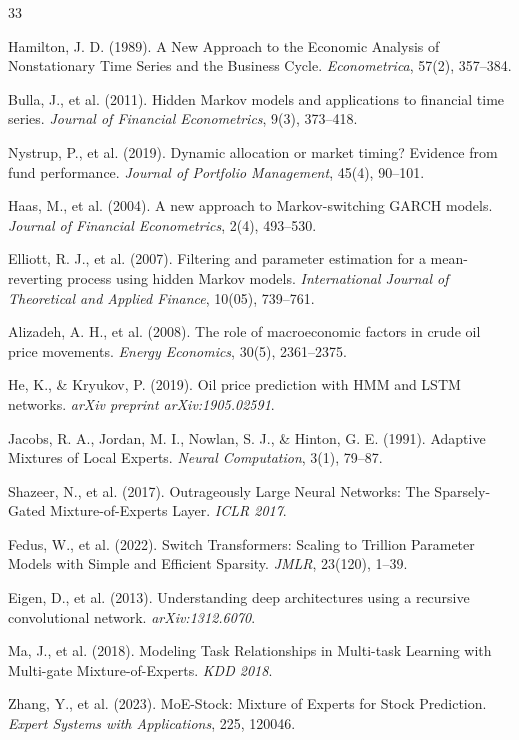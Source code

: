 \documentclass[3p,times]{elsarticle}
\begin{document}
\begin{thebibliography}{33}

Hamilton, J. D. (1989). A New Approach to the Economic Analysis of Nonstationary Time Series and the Business Cycle. \textit{Econometrica}, 57(2), 357--384.

Bulla, J., et al. (2011). Hidden Markov models and applications to financial time series. \textit{Journal of Financial Econometrics}, 9(3), 373--418.

Nystrup, P., et al. (2019). Dynamic allocation or market timing? Evidence from fund performance. \textit{Journal of Portfolio Management}, 45(4), 90--101.

Haas, M., et al. (2004). A new approach to Markov-switching GARCH models. \textit{Journal of Financial Econometrics}, 2(4), 493--530.

Elliott, R. J., et al. (2007). Filtering and parameter estimation for a mean-reverting process using hidden Markov models. \textit{International Journal of Theoretical and Applied Finance}, 10(05), 739--761.

Alizadeh, A. H., et al. (2008). The role of macroeconomic factors in crude oil price movements. \textit{Energy Economics}, 30(5), 2361--2375.

He, K., \& Kryukov, P. (2019). Oil price prediction with HMM and LSTM networks. \textit{arXiv preprint arXiv:1905.02591}.

Jacobs, R. A., Jordan, M. I., Nowlan, S. J., \& Hinton, G. E. (1991). Adaptive Mixtures of Local Experts. \textit{Neural Computation}, 3(1), 79--87.

Shazeer, N., et al. (2017). Outrageously Large Neural Networks: The Sparsely-Gated Mixture-of-Experts Layer. \textit{ICLR 2017}.

Fedus, W., et al. (2022). Switch Transformers: Scaling to Trillion Parameter Models with Simple and Efficient Sparsity. \textit{JMLR}, 23(120), 1--39.

Eigen, D., et al. (2013). Understanding deep architectures using a recursive convolutional network. \textit{arXiv:1312.6070}.

Ma, J., et al. (2018). Modeling Task Relationships in Multi-task Learning with Multi-gate Mixture-of-Experts. \textit{KDD 2018}.

Zhang, Y., et al. (2023). MoE-Stock: Mixture of Experts for Stock Prediction. \textit{Expert Systems with Applications}, 225, 120046.


\end{thebibliography}
\end{document}
